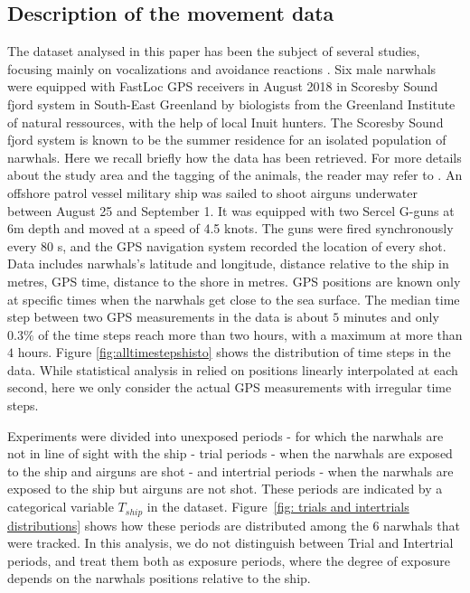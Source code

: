 \documentclass[11pt]{article}
\newcommand {\1}{\mathbb{1}}
\begin{document}
\subsection{Description of the movement data}

The dataset analysed in this paper has been the subject of several studies, focusing mainly on vocalizations and avoidance reactions \cite{heide-jorgensen_behavioral_2021,tervo_narwhals_2021}. 
Six male narwhals were equipped with FastLoc GPS receivers in August 2018 in Scoresby Sound fjord system in South-East Greenland by biologists from the Greenland Institute of natural ressources, with the help of local Inuit hunters. The Scoresby Sound fjord system
is known to be the summer residence for an isolated population of narwhals.
Here we recall briefly how the data has been retrieved. For more details about the study area and the tagging of the animals, the reader may refer to \cite{heide-jorgensen_behavioral_2021}. 
An offshore patrol vessel military ship was sailed to shoot airguns underwater between August 25 and September 1. It was equipped with two Sercel G-guns at 6m depth and moved at a speed of 4.5 knots. The guns were fired synchronously every 80 s, and the GPS navigation system recorded the location of every shot. 
Data includes narwhals's latitude and longitude, distance relative to the ship in metres, GPS time, distance to the shore in metres. GPS positions are known only at specific times when the narwhals get close to the sea surface. The median time step between two GPS measurements in the data is about $5$ minutes and only $0.3 \%$ of the time steps reach more than two hours, with a maximum at more than $4$ hours. Figure \ref{fig:alltimestepshisto} shows the distribution of time steps in the data. While statistical analysis in \cite{heide-jorgensen_behavioral_2021} relied on positions linearly interpolated at each second, here we only consider the actual GPS measurements with irregular time steps.



Experiments were divided into unexposed periods - for which the narwhals are not in line of sight with the ship - trial periods - when the narwhals are exposed to the ship and airguns are shot - and intertrial periods - when the narwhals are exposed to the ship but airguns are not shot. These periods are indicated by a categorical variable $T_{ship}$ in the dataset. Figure~\ref{fig: trials and intertrials distributions} shows how these periods are distributed among the $6$ narwhals that were tracked. In this analysis, we do not distinguish between Trial and Intertrial periods, and treat them both as exposure periods, where the degree of exposure depends on the narwhals positions relative to the ship.
\end{document}
